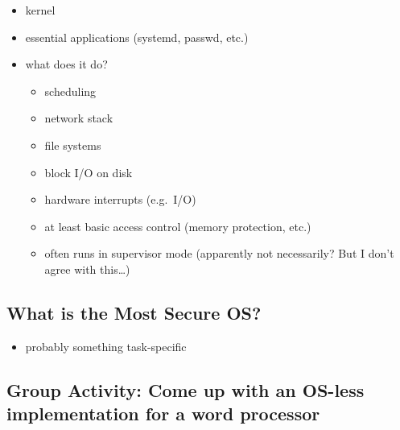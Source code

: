\documentclass[
  12pt]{findlay}
\providecommand{\tightlist}{%
  \setlength{\itemsep}{0pt}\setlength{\parskip}{0pt}}
\begin{document}
\begin{itemize}
\tightlist
\item
  kernel
\item
  essential applications (systemd, passwd, etc.)
\item
  what does it do?

  \begin{itemize}
  \tightlist
  \item
    scheduling
  \item
    network stack
  \item
    file systems
  \item
    block I/O on disk
  \item
    hardware interrupts (e.g.~I/O)
  \item
    at least basic access control (memory protection, etc.)
  \item
    often runs in supervisor mode (apparently not necessarily? But I
    don't agree with this\ldots)
  \end{itemize}
\end{itemize}

\hypertarget{what-is-the-most-secure-os}{%
\subsection{What is the Most Secure
OS?}\label{what-is-the-most-secure-os}}

\begin{itemize}
\tightlist
\item
  probably something task-specific
\end{itemize}

\hypertarget{group-activity-come-up-with-an-os-less-implementation-for-a-word-processor}{%
\subsection{Group Activity: Come up with an OS-less implementation for a
word
processor}\label{group-activity-come-up-with-an-os-less-implementation-for-a-word-processor}}
\end{document}
